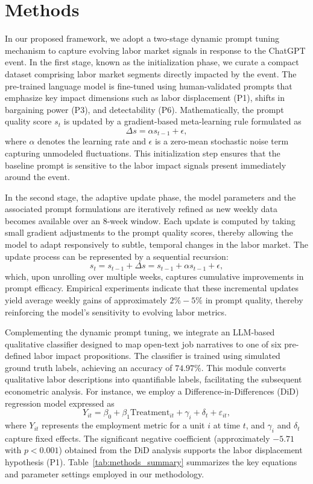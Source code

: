 \documentclass{article}
\begin{document}
\section{Methods}
In our proposed framework, we adopt a two-stage dynamic prompt tuning mechanism to capture evolving labor market signals in response to the ChatGPT event. In the first stage, known as the initialization phase, we curate a compact dataset comprising labor market segments directly impacted by the event. The pre-trained language model is fine-tuned using human-validated prompts that emphasize key impact dimensions such as labor displacement (P1), shifts in bargaining power (P3), and detectability (P6). Mathematically, the prompt quality score \( s_t \) is updated by a gradient-based meta-learning rule formulated as
\[
\Delta s = \alpha s_{t-1} + \epsilon,
\]
where \( \alpha \) denotes the learning rate and \( \epsilon \) is a zero-mean stochastic noise term capturing unmodeled fluctuations. This initialization step ensures that the baseline prompt is sensitive to the labor impact signals present immediately around the event.

In the second stage, the adaptive update phase, the model parameters and the associated prompt formulations are iteratively refined as new weekly data becomes available over an 8-week window. Each update is computed by taking small gradient adjustments to the prompt quality scores, thereby allowing the model to adapt responsively to subtle, temporal changes in the labor market. The update process can be represented by a sequential recursion:
\[
s_t = s_{t-1} + \Delta s = s_{t-1} + \alpha s_{t-1} + \epsilon,
\]
which, upon unrolling over multiple weeks, captures cumulative improvements in prompt efficacy. Empirical experiments indicate that these incremental updates yield average weekly gains of approximately \(2\%-5\%\) in prompt quality, thereby reinforcing the model’s sensitivity to evolving labor metrics.

Complementing the dynamic prompt tuning, we integrate an LLM-based qualitative classifier designed to map open-text job narratives to one of six pre-defined labor impact propositions. The classifier is trained using simulated ground truth labels, achieving an accuracy of \(74.97\%\). This module converts qualitative labor descriptions into quantifiable labels, facilitating the subsequent econometric analysis. For instance, we employ a Difference-in-Differences (DiD) regression model expressed as
\[
Y_{it} = \beta_0 + \beta_1 \text{Treatment}_{it} + \gamma_i + \delta_t + \varepsilon_{it},
\]
where \( Y_{it} \) represents the employment metric for a unit \( i \) at time \( t \), and \(\gamma_i\) and \(\delta_t\) capture fixed effects. The significant negative coefficient (approximately \(-5.71\) with \( p < 0.001 \)) obtained from the DiD analysis supports the labor displacement hypothesis (P1). Table~\ref{tab:methods_summary} summarizes the key equations and parameter settings employed in our methodology.
\end{document}
